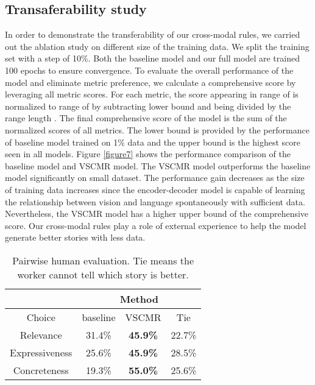 \documentclass[sigconf]{acmart}
\begin{document}
\subsection{Transaferability study}
In order to demonstrate the transferability of our cross-modal rules, we carried out the ablation study on different size of the training data. We split the training set with a step of 10\%. Both the baseline model and our full model are trained 100 epochs to ensure convergence. To evaluate the overall performance of the model and eliminate metric preference, we calculate a comprehensive score by leveraging all metric scores. For each metric, the score appearing in range of  is normalized to range of  by subtracting lower bound  and being divided by the range length . The final comprehensive score of the model is the sum of the normalized scores of all metrics. The lower bound is provided by the performance of baseline model trained on 1\% data and the upper bound is the highest score seen in all models. Figure \ref{figure7} shows the performance comparison of the baseline model and VSCMR model. The VSCMR model outperforms the baseline model significantly on small dataset. The performance gain decreases as the size of training data increases since the encoder-decoder model is capable of learning the relationship between vision and language spontaneously with sufficient data. Nevertheless, the VSCMR model has a higher upper bound of the comprehensive score. Our cross-modal rules play a role of external experience to help the model generate better stories with less data.

\begin{table}[t]
\centering
\caption{Pairwise human evaluation. Tie means the worker cannot tell which story is better.}
\begin{tabular}{c|ccc}
\hline
~&\multicolumn{3}{c}{Method}\\
\hline
Choice&baseline&VSCMR&Tie\\
\hline
Relevance&31.4\%&\textbf{45.9\%}&22.7\%\\
Expressiveness&25.6\%&\textbf{45.9\%}&28.5\%\\
Concreteness&19.3\%&\textbf{55.0\%}&25.6\%\\
\hline
\end{tabular}
\setlength{\belowcaptionskip}{10pt}
\label{table3}
\end{table}
\end{document}
